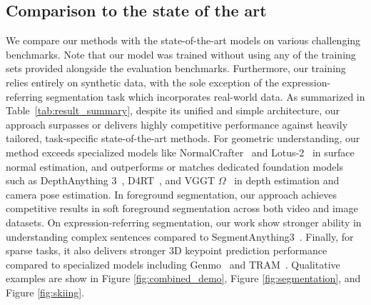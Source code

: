 \documentclass[11pt, a4paper, logo, onecolumn]{googledeepmind}
\begin{document}
\subsection{Comparison to the state of the art}
We compare our methods with the state-of-the-art models on various challenging benchmarks. Note that our model was trained without using any of the training sets provided alongside the evaluation benchmarks.
Furthermore, our training relies entirely on synthetic data, with the sole exception of the expression-referring segmentation task which incorporates real-world data.
As summarized in Table~\ref{tab:result_summary}, despite its unified and simple architecture, our approach surpasses or delivers highly competitive performance against heavily tailored, task-specific state-of-the-art methods.
For geometric understanding, our method exceeds specialized models like NormalCrafter~\cite{bin2025normalcrafter} and Lotus-2~\cite{he2025lotus} in surface normal estimation, and outperforms or matches dedicated foundation models such as DepthAnything 3~\cite{lin2025depth}, D4RT~\cite{zhang2025efficiently}, and VGGT $\Omega$~\cite{wang2026vggt} in depth estimation and camera pose estimation. In foreground segmentation, our approach achieves competitive results in soft foreground segmentation across both video and image datasets. On expression-referring segmentation, our work show stronger ability in understanding complex sentences compared to SegmentAnything3~\cite{carion2025sam}. Finally, for sparse tasks, it also delivers stronger 3D keypoint prediction performance compared to specialized models including Genmo~\cite{genmo2025} and TRAM~\cite{wang2024tram}.
Qualitative examples are show in Figure \ref{fig:combined_demo}, Figure \ref{fig:segmentation}, and Figure \ref{fig:skiing}. 
  
\end{document}
